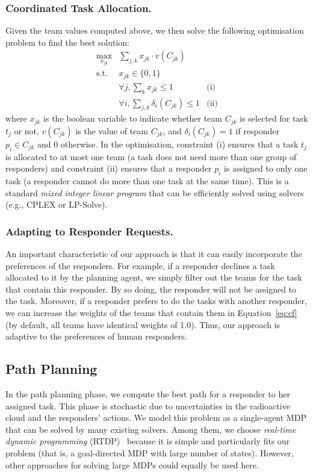 \subsubsection{Coordinated Task Allocation.}
Given the team values computed above, we then solve the following
optimisation problem to find the best solution:
\begin{equation}
  \begin{array}{lll}
    \max\limits_{x_{jk}} & \sum_{j, k} x_{jk} \cdot v(C_{jk}) & \\[2pt]
    \mbox{s.t.} & x_{jk} \in \{0, 1\} & \\[2pt]
    & \forall j, \sum_{k} x_{jk} \leq 1 & \mbox{(i)} \\[2pt]
    & \forall i, \sum_{j, k} \delta_i(C_{jk}) \leq 1 & \mbox{(ii)}
  \end{array}
  \label{eq:cf}
\end{equation}
where $x_{jk}$ is the boolean variable to indicate whether team
$C_{jk}$ is selected for task $t_j$ or not, $v(C_{jk})$ is the
value of team $C_{jk}$, and $\delta_i(C_{jk}) = 1$ if responder
$p_i\in C_{jk}$ and 0 otherwise. In the optimisation, constraint
(i) ensures that a task $t_j$ is allocated to at most one team (a
task does not need more than one group of responders) and
constraint (ii) ensures that a responder $p_i$ is assigned to only
one task (a responder cannot do more than one task at the same
time). This is a standard {\em mixed integer linear program} that
can be efficiently solved using solvers (e.g., CPLEX or LP-Solve).

\subsubsection{Adapting to Responder Requests.}\label{sec:adaptive}
An important characteristic of our approach is that it can easily
incorporate the preferences of the responders. For example, if a
responder declines a task allocated to it by the planning agent, we
simply filter out the teams for the task that contain this
responder. By so doing, the responder will not be assigned to the
task. Moreover, if a responder prefers to do the tasks with another
responder, we can increase the weights of the teams that contain
them in Equation~\ref{eq:cf} (by default, all teams have identical
weights of 1.0). Thus, our approach is adaptive to the
 preferences of human responders.\vspace{-2mm}

\subsection{Path Planning}
\label{sec:pathplanning}
In the path planning phase, we compute the best path for a
responder to her assigned task. This phase is stochastic due to uncertainties in the radioactive cloud and the responders'
actions. We model this problem as a single-agent MDP that can be
solved by many existing solvers. Among them, we choose {\em
real-time dynamic programming} (RTDP)~\cite{barto1995learning}
because it is simple and particularly fits our problem (that is, a goal-directed MDP with large number of states). However, other
approaches for solving large MDPs  could equally be used here.

